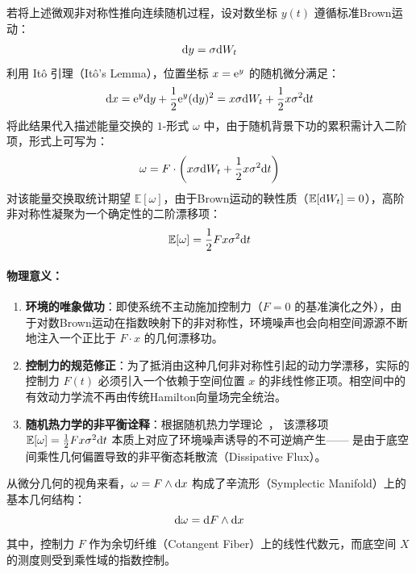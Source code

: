 ﻿\documentclass[10pt,a4paper]{article}
\numberwithin{equation}{section}
\begin{document}
若将上述微观非对称性推向连续随机过程，设对数坐标 $y(t)$ 遵循标准Brown运动：
\begin{equation}
\text dy = \sigma \text dW_t
\end{equation}
利用 It\^{o} 引理（It\^{o}'s Lemma），位置坐标 $x = \text e^y$ 的随机微分满足：
\begin{equation}
\text dx = \text e^y \text dy + \frac{1}{2}\text e^y (\text dy)^2 = x \sigma \text dW_t + \frac{1}{2}x \sigma^2 \text dt
\end{equation}
将此结果代入描述能量交换的 $1$-形式 $\omega$ 中，由于随机背景下功的累积需计入二阶项，形式上可写为：
\begin{equation}
\omega = F \cdot \left( x \sigma \text dW_t + \frac{1}{2}x \sigma^2 \text dt \right)
\end{equation}
对该能量交换取统计期望 $\mathbb E[\omega]$，由于Brown运动的鞅性质（$\mathbb E[\text dW_t] = 0$），高阶非对称性凝聚为一个确定性的二阶漂移项：
\begin{equation}
\mathbb E[\omega] = \frac{1}{2} F x \sigma^2 \text dt
\end{equation}

\paragraph{物理意义：}
\begin{enumerate}
    \item \textbf{环境的唯象做功}：即使系统不主动施加控制力（$F=0$ 的基准演化之外），由于对数Brown运动在指数映射下的非对称性，环境噪声也会向相空间源源不断地注入一个正比于 $F \cdot x$ 的几何漂移功。
    \item \textbf{控制力的规范修正}：为了抵消由这种几何非对称性引起的动力学漂移，实际的控制力 $F(t)$ 必须引入一个依赖于空间位置 $x$ 的非线性修正项。相空间中的有效动力学流不再由传统Hamilton向量场完全统治。
    \item \textbf{随机热力学的非平衡诠释}：根据随机热力学理论~\cite{Seifert2012}，
    该漂移项 $\mathbb E[\omega] = \frac{1}{2}Fx\sigma^2\text dt$
    本质上对应了环境噪声诱导的不可逆熵产生——
    是由于底空间乘性几何偏置导致的非平衡态耗散流（Dissipative Flux）。
\end{enumerate}

从微分几何的视角来看，$\omega = F \wedge \text dx$ 构成了辛流形（Symplectic Manifold）上的基本几何结构：
\begin{equation}
\text d\omega = \text dF \wedge \text dx
\end{equation}
其中，控制力 $F$ 作为余切纤维（Cotangent Fiber）上的线性代数元，而底空间 $X$ 的测度则受到乘性域的指数控制。
\end{document}
